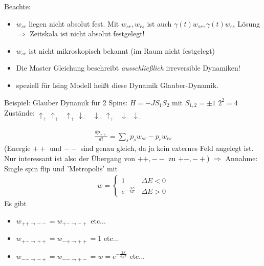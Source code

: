 \documentclass[12pt]{article}
\begin{document}
\underline{Beachte:} \begin{itemize}
\item $w_{sr}$ liegen nicht absolut fest. Mit $w_{sr}, w_{rs}$ ist auch $\gamma (t) w_{sr}, \gamma(t) w_{rs}$ Lösung \\  $\Rightarrow$ Zeitskala ist nicht absolut festgelegt!
\item $w_{sr}$ ist nicht mikroskopisch bekannt (im Raum nicht festgelegt)
\item Die Master Gleichung beschreibt \textit{ausschließlich} irreversible Dynamiken!
\item speziell für Ising Modell heißt diese Dynamik Glauber-Dynamik.


\end{itemize}
Beispiel: Glauber Dynamik für 2 Spins:  $H=-J S_1 S_2$ mit $S_{1,2} = \pm 1$
$2^2 =4$ Zustände: $ \uparrow_+ \uparrow_+ \; \; \uparrow_+ \downarrow_- \; \; \downarrow_- \uparrow_+ \; \; \downarrow_- \downarrow_-$

 \begin{align*}
 \frac{dp_{++}}{dt} = \sum_s p_s w_{sr} - p_r w_{rs}
 \end{align*}
 (Energie $++$ und $--$ sind genau gleich, da ja kein externes Feld angelegt ist. Nur interessant ist also der Übergang von $++, --$ zu $+-,-+$) $\Rightarrow$ Annahme: Single spin flip und 'Metropolis' mit \begin{align*}
 w=
 \begin{cases}
 1 & \Delta E <0 \\
 e^{- \frac{\Delta E}{kT}} & \Delta E>0
 \end{cases}
 \end{align*}
 Es gibt 
 \begin{itemize}
 \item  $w_{++ \rightarrow --}= w_{+- \rightarrow -+}$ etc...
 \item $w_{+- \rightarrow ++}= w_{-+ \rightarrow ++}=1$ etc...
 \item $w_{-- \rightarrow -+}= w_{-- \rightarrow +-}= w= e^{-\frac{2J}{k_BT}}$ etc... 
 \end{itemize}
 
\end{document}
